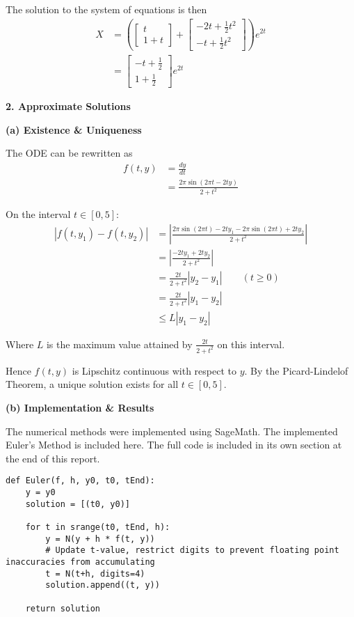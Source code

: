 \documentclass[a4paper,11pt]{article}
\begin{document}
The solution to the system of equations is then
\begin{align*}
X &= \left(\begin{bmatrix}
t \\
1 + t
\end{bmatrix} +
\begin{bmatrix}
-2t + \frac{1}{2}t^2\\
-t + \frac{1}{2}t^2
\end{bmatrix}\right)e^{2t}\\
&= \begin{bmatrix}
-t + \frac{1}{2}\\
1 + \frac{1}{2}
\end{bmatrix} e^{2t}
\end{align*}

\textbf{2. Approximate Solutions}

\textbf{(a) Existence \& Uniqueness}

The ODE can be rewritten as
\begin{align*}
f(t,y) &= \frac{dy}{dt}\\
&= \frac{2\pi \sin(2\pi t - 2ty)}{2 + t^2}
\end{align*}

On the interval $t \in [0,5]$:
\begin{align*}
|f(t, y_1) - f(t, y_2)| &= |\frac{2\pi \sin(2\pi t) - 2ty_1 - 2\pi \sin(2\pi t) + 2ty_2}{2 + t^2}|\\
&= |\frac{-2ty_1+2ty_2}{2+t^2}|\\
&= \frac{2t}{2+t^2}|y_2 - y_1| \qquad (t \geq 0) \\
&= \frac{2t}{2+t^2}|y_1 - y_2|\\
&\leq L|y_1-y_2|
\end{align*}

Where $L$ is the maximum value attained by $\frac{2t}{2+t^2}$ on this interval.

Hence $f(t,y)$ is Lipschitz continuous with respect to $y$.
By the Picard-Lindelof Theorem, a unique solution exists for all $t\in [0, 5]$.

\textbf{(b) Implementation \& Results}

The numerical methods were implemented using SageMath. The implemented Euler's Method is included here. The full code is included in its own section at the end of this report.
\begin{verbatim}
def Euler(f, h, y0, t0, tEnd):
    y = y0
    solution = [(t0, y0)]
    
    for t in srange(t0, tEnd, h):
        y = N(y + h * f(t, y))
        # Update t-value, restrict digits to prevent floating point inaccuracies from accumulating
        t = N(t+h, digits=4)
        solution.append((t, y))
        
    return solution
\end{verbatim}
\end{document}
